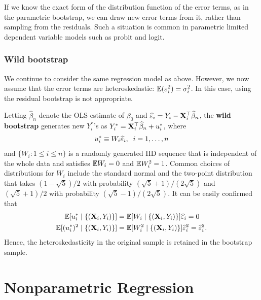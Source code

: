 \documentclass[11pt, A4paper, openany, uplatex]{book}
\begin{document}
If we know the exact form of the distribution function of the error terms, as in the parametric bootstrap, we can draw new error terms from it, rather than sampling from the residuals.
Such a situation is common in parametric limited dependent variable models such as probit and logit.

\subsection{Wild bootstrap}

We continue to consider the same regression model as above.
However, we now assume that the error terms are heteroskedastic: $\mathbb{E}(\varepsilon_i^2) = \sigma_i^2$.
In this case, using the residual bootstrap is not appropriate.

Letting $\hat \beta_n$ denote the OLS estimate of $\beta_0$ and $\widehat {\varepsilon}_i = Y_i - \mathbf{X}_i^\top \widehat \beta_n$, the \textbf{wild bootstrap} generates new $Y_i^*$'s as $Y_i^* = \mathbf{X}_i^\top \widehat \beta_n + u_i^*$, where
\begin{align*}
	u_i^* \equiv W_i \widehat {\varepsilon}_i, \;\; i = 1, \ldots, n
\end{align*}
and $\{W_i: 1 \le i \le n\}$ is a randomly generated IID sequence that is independent of the whole data and satisfies $\mathbb{E} W_i = 0$ and $\mathbb{E} W_i^2 = 1$.
Common choices of distributions for $W_i$ include the standard normal and the two-point distribution that takes $(1 - \sqrt{5})/2$ with probability $(\sqrt{5} + 1)/(2 \sqrt{5})$ and $(\sqrt{5} + 1)/2$ with probability $(\sqrt{5} - 1)/(2 \sqrt{5})$.
It can be easily confirmed that
\begin{align*}
	\mathbb{E} [u_i^* \mid \{(\mathbf{X}_i, Y_i)\}] 
	& = \mathbb{E} [W_i \mid \{(\mathbf{X}_i, Y_i)\}]  \widehat {\varepsilon}_i = 0 \\
	\mathbb{E} [(u_i^*)^2 \mid \{(\mathbf{X}_i, Y_i)\}] 
	& = \mathbb{E} [W_i^2  \mid \{(\mathbf{X}_i, Y_i)\}]  \widehat {\varepsilon}_i^2 =  \widehat {\varepsilon}_i^2.
\end{align*}
Hence, the heteroskedasticity in the original sample is retained in the bootstrap sample.


\chapter{Nonparametric Regression}
\end{document}
